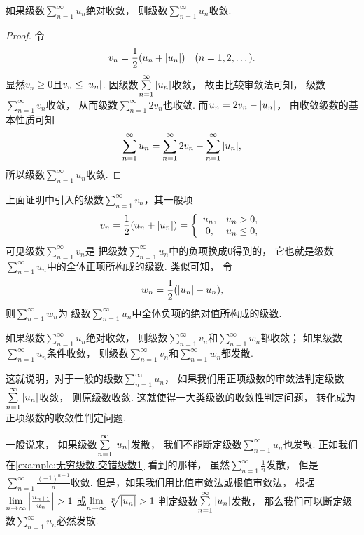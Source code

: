 \begin{theorem}\label{theorem:无穷级数.绝对收敛级数必定收敛}
如果级数\(\sum\limits_{n=1}^\infty u_n\)绝对收敛，
则级数\(\sum\limits_{n=1}^\infty u_n\)收敛.
\begin{proof}
令\[
	v_n = \frac{1}{2} (u_n + \abs{u_n})
	\quad(n=1,2,\dotsc).
\]
显然\(v_n \geq 0\)且\(v_n \leq \abs{u_n}\).
因级数\(\sum\limits_{n=1}^\infty \abs{u_n}\)收敛，
故由比较审敛法可知，
级数\(\sum\limits_{n=1}^\infty v_n\)收敛，
从而级数\(\sum\limits_{n=1}^\infty 2v_n\)也收敛.
而\(u_n = 2 v_n - \abs{u_n}\)，
由收敛级数的基本性质可知\[
	\sum\limits_{n=1}^\infty u_n
	= \sum\limits_{n=1}^\infty 2v_n
	- \sum\limits_{n=1}^\infty \abs{u_n},
\]
所以级数\(\sum\limits_{n=1}^\infty u_n\)收敛.
\end{proof}
\end{theorem}

上面证明中引入的级数\(\sum\limits_{n=1}^\infty v_n\)，其一般项\[
v_n = \frac{1}{2} (u_n + \abs{u_n})
= \left\{ \begin{array}{cl}
u_n, & u_n > 0, \\
0, & u_n \leq 0,
\end{array} \right.
\]
可见级数\(\sum\limits_{n=1}^\infty v_n\)是
把级数\(\sum\limits_{n=1}^\infty u_n\)中的负项换成\(0\)得到的，
它也就是级数\(\sum\limits_{n=1}^\infty u_n\)中的全体正项所构成的级数.
类似可知，
令\[
	w_n = \frac{1}{2} (\abs{u_n} - u_n),
\]
则\(\sum\limits_{n=1}^\infty w_n\)为
级数\(\sum\limits_{n=1}^\infty u_n\)中全体负项的绝对值所构成的级数.

如果级数\(\sum\limits_{n=1}^\infty u_n\)绝对收敛，
则级数\(\sum\limits_{n=1}^\infty v_n\)和\(\sum\limits_{n=1}^\infty w_n\)都收敛；
如果级数\(\sum\limits_{n=1}^\infty u_n\)条件收敛，
则级数\(\sum\limits_{n=1}^\infty v_n\)和\(\sum\limits_{n=1}^\infty w_n\)都发散.

这就说明，对于一般的级数\(\sum\limits_{n=1}^\infty u_n\)，
如果我们用正项级数的审敛法判定级数
\(\sum\limits_{n=1}^\infty \abs{u_n}\)收敛，
则原级数收敛.
这就使得一大类级数的收敛性判定问题，
转化成为正项级数的收敛性判定问题.

一般说来，
如果级数\(\sum\limits_{n=1}^\infty \abs{u_n}\)发散，
我们不能断定级数\(\sum\limits_{n=1}^\infty u_n\)也发散.
正如我们在\cref{example:无穷级数.交错级数1} 看到的那样，
虽然\(\sum\limits_{n=1}^\infty \frac{1}{n}\)发散，
但是\(\sum\limits_{n=1}^\infty \frac{(-1)^{n+1}}{n}\)收敛.
但是，如果我们用比值审敛法或根值审敛法，
根据\(\lim\limits_{n\to\infty} \abs{\frac{u_{n+1}}{u_n}} > 1\)
或\(\lim\limits_{n\to\infty} \sqrt[n]{\abs{u_n}} > 1\)
判定级数\(\sum\limits_{n=1}^\infty \abs{u_n}\)发散，
那么我们可以断定级数\(\sum\limits_{n=1}^\infty u_n\)必然发散.

